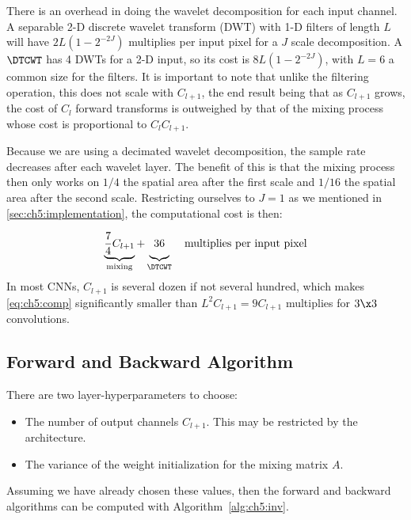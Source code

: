 There is an overhead in doing the wavelet decomposition for each input channel.
A separable 2-D discrete wavelet transform (DWT) with 1-D filters of length $L$
will have $2L\left(1-2^{-2J}\right)$ multiplies per input pixel for a $J$ scale
decomposition. A $\DTCWT$ has 4 DWTs for a 2-D input, so its cost is
$8L\left(1-2^{-2J}\right)$, with $L=6$ a common size for the filters. It is
important to note that unlike the filtering operation, this does not scale with
$C_{l+1}$, the end result being that as $C_{l+1}$ grows, the cost of $C_l$
forward transforms is outweighed by that of the mixing process whose cost is
proportional to $C_l C_{l+1}$.

Because we are using a decimated wavelet decomposition, the sample rate
decreases after each wavelet layer. The benefit of this is that the mixing
process then only works on $1/4$ the spatial area after the first scale
and $1/16$ the spatial area after the second scale. Restricting ourselves to
$J=1$ as we mentioned in \autoref{sec:ch5:implementation}, the computational cost is
then:

\begin{equation}
  \underbrace{ \frac{7}{4}C_{l+1} }_{\textrm{mixing}} +
  \underbrace{\vphantom{\frac{7}{4}} 36}_{\DTCWT} \quad
  \textrm{multiplies per input pixel}\label{eq:ch5:comp}
\end{equation}
In most CNNs, $C_{l+1}$ is several dozen if not several
hundred, which makes \eqref{eq:ch5:comp} significantly smaller than
$L^2C_{l+1}=9C_{l+1}$ multiplies for $3\x 3$ convolutions.

\subsection{Forward and Backward Algorithm}
There are two layer-hyperparameters to choose:
\begin{itemize}
  \item The number of output channels $C_{l+1}$. This may be restricted by the
    architecture.
  \item The variance of the weight initialization for the mixing matrix $A$.
\end{itemize}

Assuming we have already chosen these values, 
then the forward and backward algorithms can be computed with
Algorithm~\autoref{alg:ch5:inv}.



